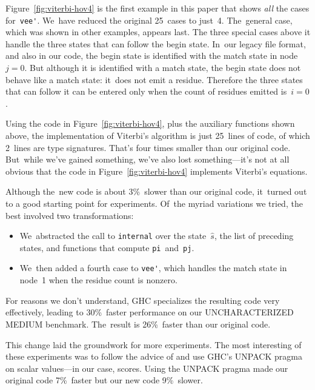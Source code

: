 \documentclass[]{jfp1}
\newcommand\figref[1]{Figure~\ref{fig:#1}}
\begin{document}
\figref{viterbi-hov4} is the first example in this paper that
shows \emph{all} the cases for~\verb+vee'+.
We~have reduced the original 25~cases to just~4.
The~general case, which was shown in other examples, appears last.
The three special cases above it handle the three states that can
follow the begin state.
In~our legacy file format, and also in our code, the begin state is
identified with the match state in node~$j=0$.
But although it is
identified with a match state, the begin state does not behave like a
match state: it~does not emit a residue.
Therefore the three states that can follow it can be entered only when the
count of residues emitted is~$i=0$.

Using the code in \figref{viterbi-hov4}, plus the auxiliary functions
shown above, the implementation of Viterbi's algorithm is just
25~lines of code, of which 2~lines are type signatures.
That's four times smaller than our original code.
But~while we've gained something, we've also lost something---it's not
at all obvious that the code in \figref{viterbi-hov4}  implements
Viterbi's equations.


Although the~new code is about 3\%~slower than our original code, 
it~turned out to a good starting point for experiments.
Of~the myriad variations we tried, 
the best involved two transformations:
\begin{itemize}
\item
We~abstracted the call to \texttt{internal} over the state~$\hat s$,
the list of preceding states, and functions that
compute \texttt{pi}~and~\texttt{pj}.
\item
We~then added a fourth case to \verb+vee'+, which handles the match
state in node~1 when the residue count is nonzero.
\end{itemize}
For reasons we don't understand, GHC specializes the resulting code
very effectively, leading to 30\%~faster performance on our
UNCHARACTERIZED MEDIUM benchmark.
The~result is 26\%~faster than our original code.

This change laid the groundwork for more experiments.
The most interesting of these experiments was to follow the advice of
\citet{tibell:high-performance} and use GHC's UNPACK pragma on scalar
values---in our case, scores.
Using the UNPACK pragma made our original code 7\%~faster but our new
code 9\%~slower.
\end{document}
